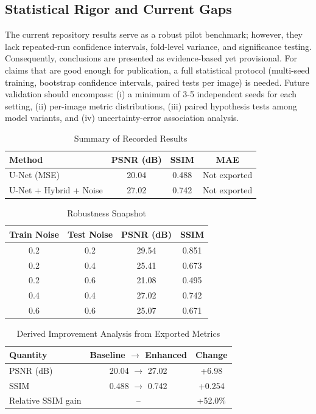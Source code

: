 \documentclass[conference]{IEEEtran}
\begin{document}
\subsection{Statistical Rigor and Current Gaps}
The current repository results serve as a robust pilot benchmark; however, they lack repeated-run confidence intervals, fold-level variance, and significance testing. Consequently, conclusions are presented as evidence-based yet provisional. For claims that are good enough for publication, a full statistical protocol (multi-seed training, bootstrap confidence intervals, paired tests per image) is needed. Future validation should encompass: (i) a minimum of 3-5 independent seeds for each setting, (ii) per-image metric distributions, (iii) paired hypothesis tests among model variants, and (iv) uncertainty-error association analysis.

\begin{table}[t]
\caption{Summary of Recorded Results}
\label{tab:summary_results}
\centering
\begin{tabular}{lccc}
\toprule
Method & PSNR (dB) & SSIM & MAE \\
\midrule
U-Net (MSE) & 20.04 & 0.488 & Not exported \\
U-Net + Hybrid + Noise & 27.02 & 0.742 & Not exported \\
\bottomrule
\end{tabular}
\end{table}

\begin{table}[t]
\caption{Robustness Snapshot}
\label{tab:robustness}
\centering
\begin{tabular}{cccc}
\toprule
Train Noise & Test Noise & PSNR (dB) & SSIM \\
\midrule
0.2 & 0.2 & 29.54 & 0.851 \\
0.2 & 0.4 & 25.41 & 0.673 \\
0.2 & 0.6 & 21.08 & 0.495 \\
0.4 & 0.4 & 27.02 & 0.742 \\
0.6 & 0.6 & 25.07 & 0.671 \\
\bottomrule
\end{tabular}
\end{table}

\begin{table}[t]
\caption{Derived Improvement Analysis from Exported Metrics}
\label{tab:derived}
\centering
\begin{tabular}{lcc}
\toprule
Quantity & Baseline $\rightarrow$ Enhanced & Change \\
\midrule
PSNR (dB) & 20.04 $\rightarrow$ 27.02 & +6.98 \\
SSIM & 0.488 $\rightarrow$ 0.742 & +0.254 \\
Relative SSIM gain & -- & +52.0\% \\
\bottomrule
\end{tabular}
\end{table}
\end{document}

